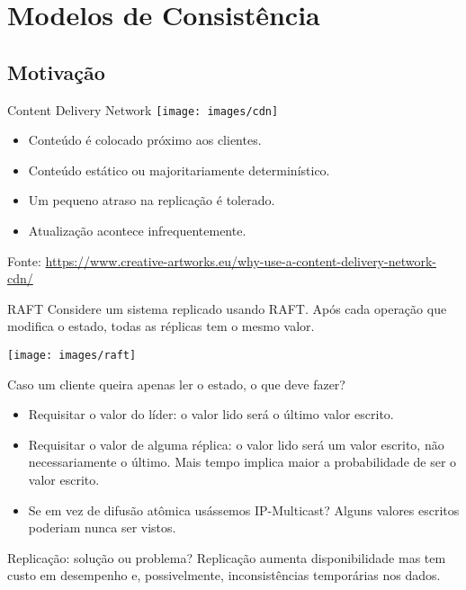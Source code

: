 \section{Modelos de Consistência}

\subsection{Motivação}

\begin{frame}{Content Delivery Network}
\texttt{[image: images/cdn]}

\begin{itemize}
	\item Conteúdo é colocado próximo aos clientes. 
	\item Conteúdo estático ou majoritariamente determinístico. 
	\item Um pequeno atraso na replicação é tolerado.
	\item Atualização acontece infrequentemente.
\end{itemize}

Fonte: \url{https://www.creative-artworks.eu/why-use-a-content-delivery-network-cdn/}
\end{frame}


\begin{frame} {RAFT}
Considere um sistema replicado usando RAFT. Após cada operação que modifica o estado, todas as réplicas tem o mesmo valor.

\texttt{[image: images/raft]} %

Caso um cliente queira apenas ler o estado, o que deve fazer?
\pause
\begin{itemize}
	\item Requisitar o valor do líder\pause : o valor lido será \alert{o último} valor escrito.\pause
	\item Requisitar o valor de alguma réplica\pause : o valor lido será \alert{um} valor escrito, não necessariamente o último. Mais tempo implica maior a probabilidade de ser o valor escrito.\pause
	\item Se em vez de difusão atômica usássemos IP-Multicast?\pause{} Alguns valores escritos poderiam nunca ser vistos.
\end{itemize}
\end{frame}

\begin{frame}{Replicação: solução ou problema?}
	Replicação aumenta disponibilidade mas tem custo em desempenho e, possivelmente, inconsistências temporárias nos dados.
\end{frame}

